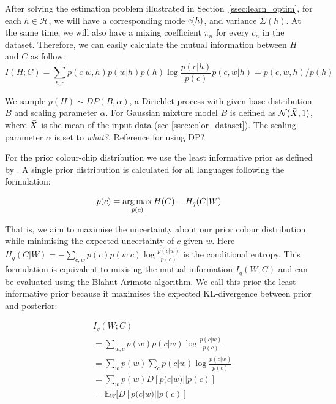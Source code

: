 \documentclass[11pt]{article}
\begin{document}
After solving the estimation problem illustrated in Section~\ref{ssec:learn_optim}, for each $h\in\mathcal{H}$, we will have a corresponding mode ${\textnormal{c}}(h)$, and variance $\Sigma(h)$. 
At the same time, we will also have a mixing coefficient $\pi_n$ for every $c_n$ in the dataset.
Therefore, we can easily calculate the mutual information between $H$ and $C$ as follow:
\begin{equation}
    I(H;C) = \sum_{h,c} p(c|w,h)p(w|h)p(h)\log\frac{p(c|h)}{p(c)}
p(c, w | h)=p(c,w,h)/p(h)
\end{equation}


We sample $p(H) \sim DP(B, \alpha)$, a Dirichlet-process with given base distribution $B$ and scaling parameter $\alpha$. For Gaussian mixture model $B$ is defined as $\mathcal{N}(\Bar{X},1)$, where $\Bar{X}$ is the mean of the input data (see \ref{ssec:color_dataset}). The scaling parameter $\alpha$ is set to \textit{what?}. Reference for using DP?

For the prior colour-chip distribution we use the least informative prior as defined by \cite{zaslavsky2018efficient}. A single prior distribution is calculated for all languages following the formulation:

\[p(c)=\operatorname*{arg\,max}_{p(c)} H(C)-H_q(C|W)\]

That is, we aim to maximise the uncertainty about our prior colour distribution while minimising the expected uncertainty of $c$ given $w$. Here $H_q(C|W)=-\sum_{c,w} p(c)p(w|c)\log \frac{p(c|w)}{p(c)}$ is the conditional entropy. This formulation is equivalent to mixising the mutual information $I_q(W;C)$ and can be evaluated using the Blahut-Arimoto algorithm. We call this prior the least informative prior because it maximises the expected KL-divergence between prior and posterior:

\begin{align*}
        & I_q(W;C)\\
        &  = \sum_{w,c} p(w)p(c|w)\log \frac{p(c|w)}{p(c)} \\
        &  = \sum_{w} p(w) \sum_c p(c|w)\log \frac{p(c|w)}{p(c)} \\
        &  = \sum_{w} p(w) D[p(c|w)||p(c)] \\
        & = \mathbb{E}_{W}[D[p(c|w)||p(c)]
    \label{eq:least_informative_prior}
\end{align*}
\end{document}

